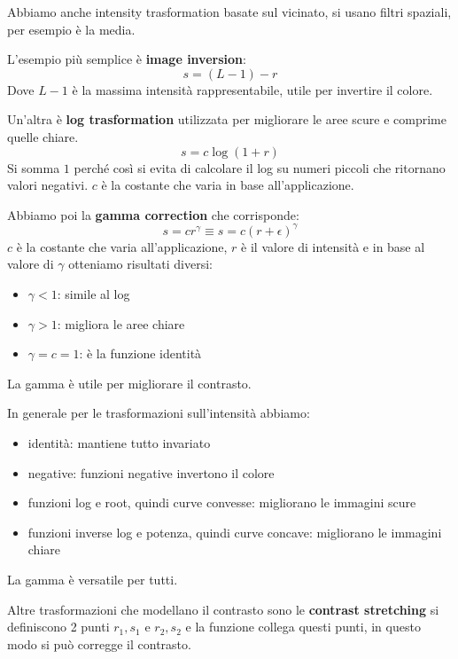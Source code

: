 Abbiamo anche intensity trasformation basate sul vicinato, si usano filtri spaziali,
per esempio è la media.

L'esempio più semplice è \textbf{image inversion}:
\begin{equation}
    s = (L-1)-r
\end{equation}
Dove $L-1$ è la massima intensità rappresentabile, utile per invertire il colore.

Un'altra è \textbf{log trasformation} utilizzata per migliorare le aree scure e
comprime quelle chiare.
\begin{equation}
    s=c\log (1+r)
\end{equation}
Si somma $1$ perché così si evita di calcolare il log su numeri piccoli che
ritornano valori negativi. $c$ è la costante che varia in base all'applicazione.

Abbiamo poi la \textbf{gamma correction} che corrisponde:
\begin{equation}
    s=cr^\gamma \equiv s=c(r+\epsilon)^\gamma
\end{equation}
$c$ è la costante che varia all'applicazione, $r$ è il valore di intensità e in
base al valore di $\gamma$ otteniamo risultati diversi:
\begin{itemize}
    \item $\gamma < 1$: simile al log
    \item $\gamma > 1$: migliora le aree chiare
    \item $\gamma =c = 1$: è la funzione identità
\end{itemize}
La gamma è utile per migliorare il contrasto.

In generale per le trasformazioni sull'intensità abbiamo:
\begin{itemize}
    \item identità: mantiene tutto invariato
    \item negative: funzioni negative invertono il colore
    \item funzioni log e root, quindi curve convesse: migliorano le immagini scure
    \item funzioni inverse log e potenza, quindi curve concave: migliorano le immagini chiare
\end{itemize}
La gamma è versatile per tutti.

Altre trasformazioni che modellano il contrasto sono le \textbf{contrast stretching}
si definiscono 2 punti $r_1,s_1$ e $r_2,s_2$ e la funzione collega questi punti,
in questo modo si può corregge il contrasto.

